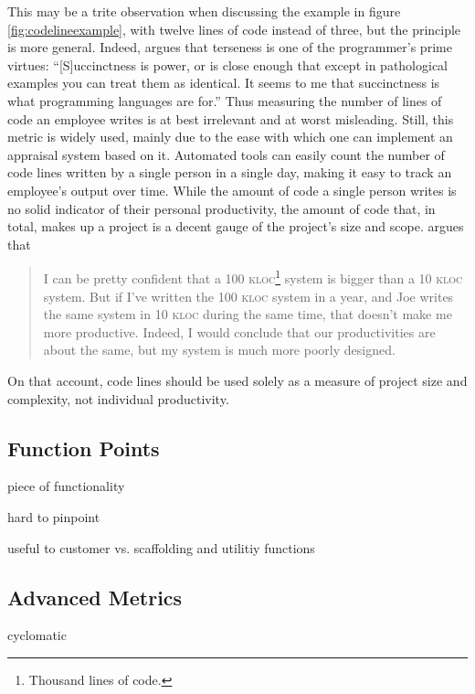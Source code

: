 \documentclass[letterpaper, 10pt]{report}
\begin{document}
This may be a trite observation when discussing the example in figure \ref{fig:codelineexample}, with twelve lines of code instead of three, but the principle is more general. 
Indeed, \textcite{graham:succinctness} argues that terseness is one of the programmer's prime virtues:
``[S]uccinctness is power, or is close enough that except in pathological examples you can treat them as identical.
It seems to me that succinctness is what programming languages are for.''
Thus measuring the number of lines of code an employee writes is at best irrelevant and at worst misleading. 
Still, this metric is widely used, mainly due to the ease with which one can implement an appraisal system based on it. 
Automated tools can easily count the number of code lines written by a single person in a single day, making it easy to track an employee's output over time. 
While the amount of code a single person writes is no solid indicator of their personal productivity, the amount of code that, in total, makes up a project is a decent gauge of the project's size and scope. 
\textcite{fowler:cannotmeasure} argues that

\begin{quote}
I can be pretty confident that a 100 \textsc{kloc}\footnote{Thousand lines of code.} system is bigger than a 10 \textsc{kloc} system. But if I've written the 100 \textsc{kloc} system in a year, and Joe writes the same system in 10 \textsc{kloc} during the same time, that doesn't make me more productive. Indeed, I would conclude that our productivities are about the same, but my system is much more poorly designed.
\end{quote}

On that account, code lines should be used solely as a measure of project size and complexity, not individual productivity.


\subsection{Function Points}
piece of functionality

hard to pinpoint

useful to customer vs. scaffolding and utilitiy functions

\subsection{Advanced Metrics}
cyclomatic
\end{document}
